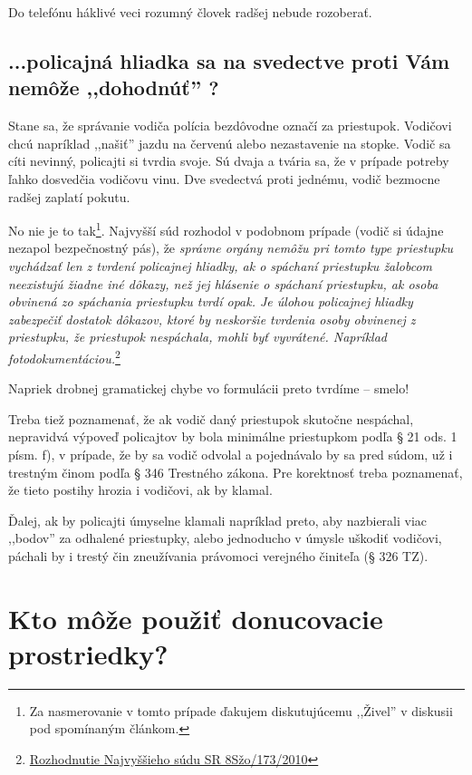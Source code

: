 \documentclass[openany]{book}
\begin{document}
Do telefónu háklivé veci rozumný človek radšej nebude rozoberať.


\section*{...policajná hliadka sa na svedectve proti Vám nemôže ,,dohodnúť'' ?}

Stane sa, že správanie vodiča polícia bezdôvodne označí za priestupok. Vodičovi chcú napríklad ,,našiť'' jazdu na červenú alebo nezastavenie na stopke\cite{lejkova}. Vodič sa cíti nevinný, policajti si tvrdia svoje. Sú dvaja a tvária sa, že v prípade potreby ľahko dosvedčia vodičovu vinu. Dve svedectvá proti jednému, vodič bezmocne radšej zaplatí pokutu.

No nie je to tak\footnote{Za nasmerovanie v tomto prípade ďakujem diskutujúcemu ,,Živel'' v diskusii pod spomínaným článkom.}. Najvyšší súd rozhodol v podobnom prípade (vodič si údajne nezapol bezpečnostný pás), že \emph {správne orgány nemôžu pri tomto type priestupku vychádzať len z
tvrdení policajnej hliadky, ak o spáchaní priestupku žalobcom neexistujú žiadne iné dôkazy, než jej hlásenie o spáchaní priestupku, ak osoba obvinená zo spáchania priestupku tvrdí opak. Je úlohou policajnej hliadky zabezpečiť dostatok dôkazov, ktoré by neskoršie tvrdenia osoby obvinenej z priestupku, že priestupok nespáchala, mohli
byť vyvrátené. Napríklad fotodokumentáciou.}\footnote{\href{http://www.supcourt.gov.sk/data/att/2074\_subor.pdf}{Rozhodnutie Najvyššieho súdu SR 8Sžo/173/2010}}

Napriek drobnej gramatickej chybe vo formulácii preto tvrdíme -- smelo!

Treba tiež poznamenať, že ak vodič daný priestupok skutočne nespáchal, nepravidvá výpoveď policajtov by bola minimálne priestupkom podľa § 21 ods. 1 písm. f), v prípade, že by sa vodič odvolal a pojednávalo by sa pred súdom, už i trestným činom podľa § 346 Trestného zákona. Pre korektnosť treba poznamenať, že tieto postihy hrozia i vodičovi, ak by klamal.

Ďalej, ak by policajti úmyselne klamali napríklad preto, aby nazbierali viac ,,bodov'' za odhalené priestupky, alebo jednoducho v úmysle uškodiť vodičovi, páchali by i trestý čin zneužívania právomoci verejného činiteľa (§ 326 TZ).

\chapter{Kto môže použiť donucovacie prostriedky?}
\end{document}
